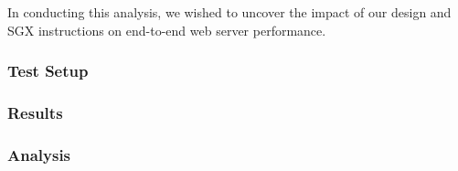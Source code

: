 \documentclass[../../../main.tex]{subfiles}
\begin{document}
In conducting this analysis, we wished to uncover the impact of our
design and SGX instructions on end-to-end web server performance.
\subsubsection*{Test Setup}
\subsubsection*{Results}
\subsubsection*{Analysis}
\end{document}
